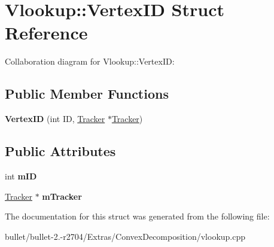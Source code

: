 \hypertarget{struct_vlookup_1_1_vertex_i_d}{\section{Vlookup\+:\+:Vertex\+I\+D Struct Reference}
\label{struct_vlookup_1_1_vertex_i_d}
}


Collaboration diagram for Vlookup\+:\+:Vertex\+I\+D\+:
\subsection*{Public Member Functions}
\begin{DoxyCompactItemize}
\item 
\hypertarget{struct_vlookup_1_1_vertex_i_d_ae09be9904957623b48f451f1f90048d5}{{\bfseries Vertex\+I\+D} (int I\+D, \hyperlink{struct_vlookup_1_1_tracker}{Tracker} $\ast$\hyperlink{struct_vlookup_1_1_tracker}{Tracker})}\label{struct_vlookup_1_1_vertex_i_d_ae09be9904957623b48f451f1f90048d5}

\end{DoxyCompactItemize}
\subsection*{Public Attributes}
\begin{DoxyCompactItemize}
\item 
\hypertarget{struct_vlookup_1_1_vertex_i_d_a4278ec53acb37320b0fedb993067505e}{int {\bfseries m\+I\+D}}\label{struct_vlookup_1_1_vertex_i_d_a4278ec53acb37320b0fedb993067505e}

\item 
\hypertarget{struct_vlookup_1_1_vertex_i_d_ad80ea39c55805a62624c1b1a29231a6b}{\hyperlink{struct_vlookup_1_1_tracker}{Tracker} $\ast$ {\bfseries m\+Tracker}}\label{struct_vlookup_1_1_vertex_i_d_ad80ea39c55805a62624c1b1a29231a6b}

\end{DoxyCompactItemize}


The documentation for this struct was generated from the following file\+:\begin{DoxyCompactItemize}
\item 
bullet/bullet-\/2.-\/r2704/\+Extras/\+Convex\+Decomposition/vlookup.\+cpp\end{DoxyCompactItemize}
